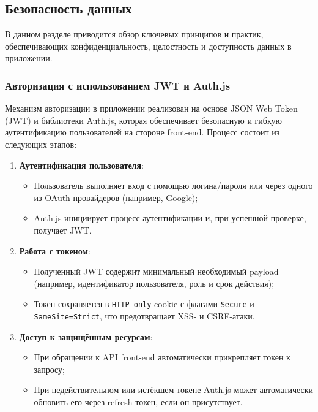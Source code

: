 \subsection{Безопасность данных}

В данном разделе приводится обзор ключевых принципов и практик, обеспечивающих конфиденциальность, целостность и доступность данных в приложении.

\subsubsection{Авторизация с использованием JWT и Auth.js}
Механизм авторизации в приложении реализован на основе JSON Web Token (JWT) и библиотеки Auth.js, которая обеспечивает безопасную и гибкую аутентификацию пользователей на стороне front-end. Процесс состоит из следующих этапов:
\begin{enumerate}
  \item \textbf{Аутентификация пользователя}:
    \begin{itemize}
      \item Пользователь выполняет вход с помощью логина/пароля или через одного из OAuth-провайдеров (например, Google);
      \item Auth.js инициирует процесс аутентификации и, при успешной проверке, получает JWT.
    \end{itemize}
  \item \textbf{Работа с токеном}:
    \begin{itemize}
      \item Полученный JWT содержит минимальный необходимый payload (например, идентификатор пользователя, роль и срок действия);
      \item Токен сохраняется в \texttt{HTTP-only} cookie с флагами \texttt{Secure} и \texttt{SameSite=Strict}, что предотвращает XSS- и CSRF-атаки.
    \end{itemize}
  \item \textbf{Доступ к защищённым ресурсам}:
    \begin{itemize}
      \item При обращении к API front-end автоматически прикрепляет токен к запросу;
      \item При недействительном или истёкшем токене Auth.js может автоматически обновить его через refresh-токен, если он присутствует.
    \end{itemize}
\end{enumerate}

